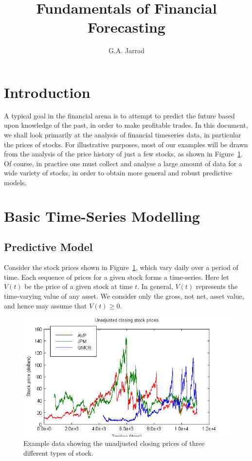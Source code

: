 \documentclass[a4paper]{article}
\title{Fundamentals of Financial Forecasting}
\author{G.A. Jarrad}
\begin{document}
\maketitle
{}
\section{Introduction}\label{sec:intro}
A typical goal in the financial arena is to attempt to predict the future based upon knowledge of the past, in order to make profitable trades.
In this document, we shall look primarily at the analysis of financial timeseries data, in particular the prices of stocks.
For illustrative purposes, most of our examples will be drawn from the analysis of the price history of just a few stocks, as shown
in Figure~\ref{fig:stock-prices}. Of course, in practice one must collect and analyse a large amount of data for a wide variety of stocks, 
in order to obtain more general and robust predictive models.

\section{Basic Time-Series Modelling}

\subsection{Predictive Model}
Consider the stock prices shown in Figure~\ref{fig:stock-prices},
which vary daily over a period of time.
Each sequence of prices for a given stock forms a time-series.
Here let $V(t)$ be the price of a given stock at time $t$. In general,
$V(t)$ represents the time-varying value of any asset. We
consider only the gross, not net, asset value, and hence may assume that $V(t)\ge 0$.
\begin{figure}[hbt]
\includegraphics[scale=0.8]{figures/stock-prices-close.png}
\caption{Example data showing the unadjusted closing prices of three different
types of stock.}
\label{fig:stock-prices}
\end{figure}
\end{document}
